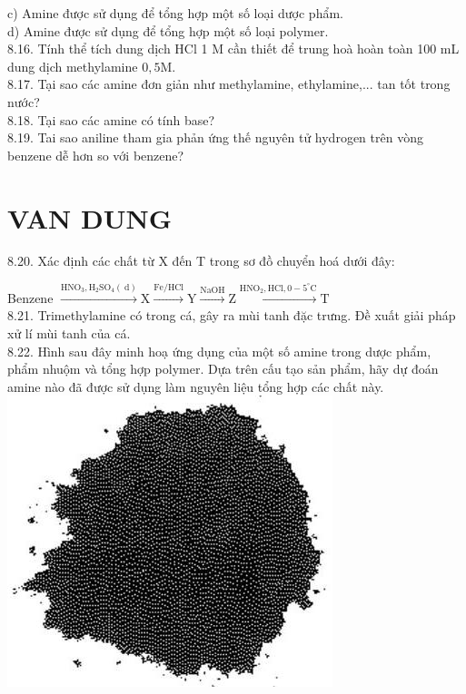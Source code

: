 \documentclass[10pt]{article}
\begin{document}
c) Amine được sử dụng để tổng hợp một số loại dược phẩm.\\
d) Amine được sử dụng để tổng hợp một số loại polymer.\\
8.16. Tính thể tích dung dịch HCl 1 M cần thiết để trung hoà hoàn toàn 100 mL dung dịch methylamine $0,5 \mathrm{M}$.\\
8.17. Tại sao các amine đơn giản như methylamine, ethylamine,... tan tốt trong nước?\\
8.18. Tại sao các amine có tính base?\\
8.19. Tai sao aniline tham gia phản ứng thế nguyên tử hydrogen trên vòng benzene dễ hơn so với benzene?

\section*{VAN DUNG}
8.20. Xác định các chất từ X đến T trong sơ đồ chuyển hoá dưới đây:

Benzene $\xrightarrow{\mathrm{HNO}_{3}, \mathrm{H}_{2} \mathrm{SO}_{4}(\mathrm{~d})} \mathrm{X} \xrightarrow{\mathrm{Fe} / \mathrm{HCl}} \mathrm{Y} \xrightarrow{\mathrm{NaOH}} \mathrm{Z} \xrightarrow{\mathrm{HNO}_{2}, \mathrm{HCl}, 0-5^{\circ} \mathrm{C}} \mathrm{T}$\\
8.21. Trimethylamine có trong cá, gây ra mùi tanh đặc trưng. Đề xuất giải pháp xử lí mùi tanh của cá.\\
8.22. Hình sau đây minh hoạ ứng dụng của một số amine trong dược phẩm, phẩm nhuộm và tổng hợp polymer. Dựa trên cấu tạo sản phẩm, hãy dự đoán amine nào đã được sử dụng làm nguyên liệu tổng hợp các chất này.\\
\includegraphics[max width=\textwidth, center]{2025_10_23_74efce88ce3a451fd6b0g-025(1)}
\end{document}
